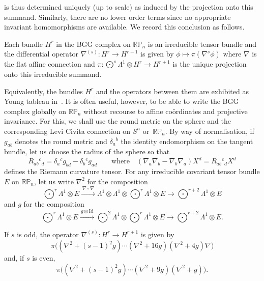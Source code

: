 is thus determined uniquely (up to scale) as induced by the projection onto
this summand. Similarly, there are no lower order terms since no appropriate
invariant homomorphisms are available. We record this conclusion as follows.
\begin{theorem}
Each bundle $H^r$ in the BGG complex on ${\mathbb{RP}}_n$ is an irreducible
tensor bundle and the differential operator $\nabla^{(s)}:H^r\to H^{r+1}$ is
given by $\phi\mapsto\pi(\nabla^s\phi)$ where $\nabla$ is the flat affine
connection and $\pi:\bigodot^s\!\Lambda^1\otimes H^r\to H^{r+1}$ is the unique
projection onto this irreducible summand.
\end{theorem}
Equivalently, the bundles $H^r$ and the operators between them are exhibited as
Young tableau in~\cite{eProjective}. It is often useful, however, to be
able to write the BGG complex globally on ${\mathbb{RP}}_n$ without recourse to
af\/f\/ine co\"ordinates and projective invariance. For this, we shall use the
round metric on the sphere and the corresponding Levi Civita connection on
$S^n$ or~${\mathbb{RP}}_n$. By way of normalisation, if $g_{ab}$ denotes the
round metric and $\delta_a{}^b$ the identity endomorphism on the tangent
bundle, let us choose the radius of the sphere so that
\begin{equation}\label{cc}
R_{ab}{}^c{}_d=\delta_a{}^cg_{bd}-\delta_b{}^cg_{ad}\qquad\mbox{where}\quad
(\nabla_a\nabla_b-\nabla_b\nabla_a)X^d=R_{ab}{}^c{}_dX^d\end{equation}
def\/ines the Riemann curvature tensor. For any irreducible covariant tensor
bundle $E$ on ${\mathbb{RP}}_n$, let us write $\nabla^2$ for the composition
\[\textstyle\bigodot^r\!\Lambda^1\otimes E\xrightarrow{\,\nabla\circ\nabla\,}
\Lambda^1\otimes\Lambda^1\otimes\bigodot^r\!\Lambda^1\otimes E\to
\bigodot^{r+2}\!\Lambda^1\otimes E\]
and $g$ for the composition
\[\textstyle\bigodot^r\!\Lambda^1\otimes E
\xrightarrow{\,g\otimes{\mathrm{Id}}\,}
\bigodot^2\!\Lambda^1\otimes\bigodot^r\!\Lambda^1\otimes E\to
\bigodot^{r+2}\!\Lambda^1\otimes E.\]
\begin{theorem}\label{round_formulae}
If $s$ is odd, the operator $\nabla^{(s)}:H^r\to H^{r+1}$ is given by
\[\pi\big((\nabla^2+(s-1)^2g)\cdots(\nabla^2+16g)(\nabla^2+4g)\nabla\big)\]
and, if $s$ is even,
\[\pi\big((\nabla^2+(s-1)^2g)\cdots(\nabla^2+9g)(\nabla^2+g)\big).\]
\end{theorem}
